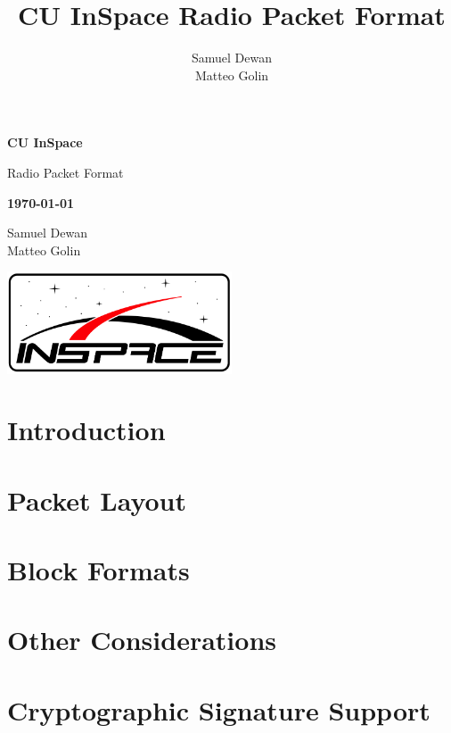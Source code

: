 \documentclass[11pt,letterpaper]{article}
\title{CU InSpace Radio Packet Format}
\author{Samuel Dewan\\Matteo Golin}
\begin{document}
\frenchspacing

\begin{titlepage}
    \centering

    {\large \textbf{CU InSpace}}

    {\Huge \sffamily Radio Packet Format}

    {\large \textbf{\today}}

    Samuel Dewan \\
    Matteo Golin

    \includegraphics[width=0.5\textwidth]{logo.png}

\end{titlepage}

\tableofcontents
\clearpage
{}

\section{Introduction}
\label{sec:introduction}

\clearpage

\section{Packet Layout}
\label{sec:packet-layout}

\clearpage

\section{Block Formats}
\label{sec:block-formats}

\clearpage

\section{Other Considerations}
\label{sec:other-considerations}

\clearpage

\section{Cryptographic Signature Support}
\label{sec:signatures}

\end{document}
